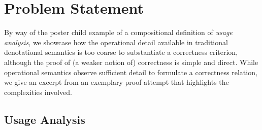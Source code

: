 \section{Problem Statement}
\label{sec:problem}

By way of the poster child example of a compositional definition of \emph{usage
analysis}, we showcase how the operational detail available in traditional
denotational semantics is too coarse to substantiate a correctness criterion,
although the proof of (a weaker notion of) correctness is simple and direct.
While operational semantics observe sufficient detail to formulate a correctness
relation, we give an excerpt from an exemplary proof attempt that highlights the
complexities involved.


%
%

\subsection{Usage Analysis}

